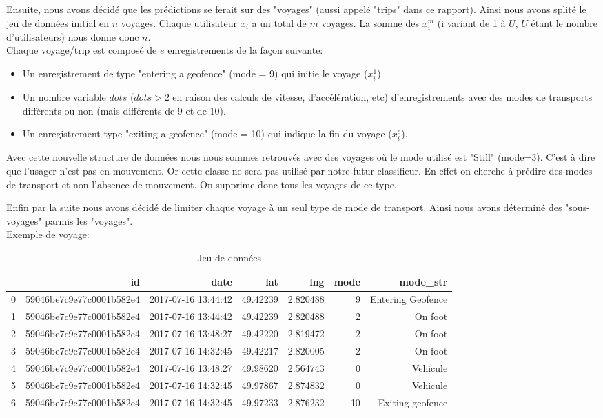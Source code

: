 \documentclass{article}
\begin{document}
Ensuite, nous avons décidé que les prédictions se ferait sur des "voyages" (aussi appelé "trips" dans ce rapport). Ainsi nous avons splité le jeu de données initial en $n$ voyages. Chaque utilisateur $x_{i}$ a un total de $m$ voyages. La somme des $x_{i}^{m}$ (i variant de 1 à $U$, $U$ étant le nombre d'utilisateurs) nous donne donc $n$.\\

Chaque voyage/trip est composé de $e$ enregistrements de la façon suivante:
\begin{itemize}
    \item Un enregistrement de type "entering a geofence" (mode = 9) qui initie le voyage ($x_{i}^{1}$)
    \item Un nombre variable $dots$ ($dots > 2$ en raison des calculs de vitesse, d'accélération, etc) d'enregistrements avec des modes de transports différents ou non (mais différents de 9 et de 10).
    \item Un enregistrement type "exiting a geofence" (mode = 10) qui indique la fin du voyage ($x_{i}^{e}$).\\
\end{itemize}

Avec cette nouvelle structure de données nous nous sommes retrouvés avec des voyages où le mode utilisé est "Still" (mode=3). C'est à dire que l'usager n'est pas en mouvement. Or cette classe ne sera pas utilisé par notre futur classifieur. En effet on cherche à prédire des modes de transport et non l'absence de mouvement. On supprime donc tous les voyages de ce type.

Enfin par la suite nous avons décidé de limiter chaque voyage à un seul type de mode de transport. Ainsi nous avons déterminé des "sous-voyages" parmis les "voyages".\\ 

Exemple de voyage:

\begin{table}[H]
\centering
\captionsetup{justification=centering}
    \caption{Jeu de données}
\begin{tabular}{rrrrrrr}
  \hline
 & id & date & lat & lng & mode & mode\_str\\ 
  \hline
0 & 59046be7c9e77c0001b582e4 & 2017-07-16 13:44:42 & 49.42239 & 2.820488 & 9 & Entering Geofence \\
1 & 59046be7c9e77c0001b582e4 & 2017-07-16 13:44:42 & 49.42239 & 2.820488 & 2 & On foot  \\
2 & 59046be7c9e77c0001b582e4 & 2017-07-16 13:48:27 & 49.42220 & 2.819472 & 2 & On foot \\
3 & 59046be7c9e77c0001b582e4 & 2017-07-16 14:32:45 & 49.42217 & 2.820005  & 2 & On foot \\
4 & 59046be7c9e77c0001b582e4 & 2017-07-16 13:48:27 & 49.98620 & 2.564743 & 0 & Vehicule \\
5 & 59046be7c9e77c0001b582e4 & 2017-07-16 14:32:45 & 49.97867 & 2.874832  & 0 & Vehicule \\
6 & 59046be7c9e77c0001b582e4 & 2017-07-16 14:32:45 & 49.97233 & 2.876232  & 10 & Exiting geofence \\
   
\end{tabular}
\end{table}
\end{document}
